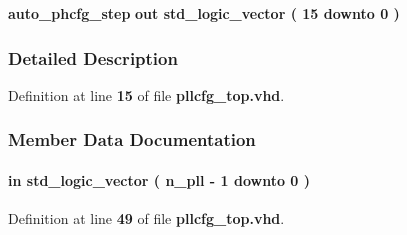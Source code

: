 \begin{DoxyCompactItemize}
\item 
{\bf auto\+\_\+phcfg\+\_\+step}  {\bfseries {\bfseries \textcolor{keywordflow}{out}\textcolor{vhdlchar}{ }}} {\bfseries \textcolor{comment}{std\+\_\+logic\+\_\+vector}\textcolor{vhdlchar}{ }\textcolor{vhdlchar}{(}\textcolor{vhdlchar}{ }\textcolor{vhdlchar}{ } \textcolor{vhdldigit}{15} \textcolor{vhdlchar}{ }\textcolor{keywordflow}{downto}\textcolor{vhdlchar}{ }\textcolor{vhdlchar}{ } \textcolor{vhdldigit}{0} \textcolor{vhdlchar}{ }\textcolor{vhdlchar}{)}\textcolor{vhdlchar}{ }} 
\end{DoxyCompactItemize}


\subsubsection{Detailed Description}


Definition at line {\bf 15} of file {\bf pllcfg\+\_\+top.\+vhd}.



\subsubsection{Member Data Documentation}
\paragraph[{auto\+\_\+phcfg\+\_\+done}]{ {\bfseries \textcolor{keywordflow}{in}\textcolor{vhdlchar}{ }} {\bfseries \textcolor{comment}{std\+\_\+logic\+\_\+vector}\textcolor{vhdlchar}{ }\textcolor{vhdlchar}{(}\textcolor{vhdlchar}{ }\textcolor{vhdlchar}{ }\textcolor{vhdlchar}{ }\textcolor{vhdlchar}{ }{\bfseries {\bf n\+\_\+pll}} \textcolor{vhdlchar}{-\/}\textcolor{vhdlchar}{ } \textcolor{vhdldigit}{1} \textcolor{vhdlchar}{ }\textcolor{keywordflow}{downto}\textcolor{vhdlchar}{ }\textcolor{vhdlchar}{ } \textcolor{vhdldigit}{0} \textcolor{vhdlchar}{ }\textcolor{vhdlchar}{)}\textcolor{vhdlchar}{ }} \hspace{0.3cm}{\ttfamily [Port]}}\label{classpllcfg__top_a669719de9d73538552d233d53845ab33}


Definition at line {\bf 49} of file {\bf pllcfg\+\_\+top.\+vhd}.

